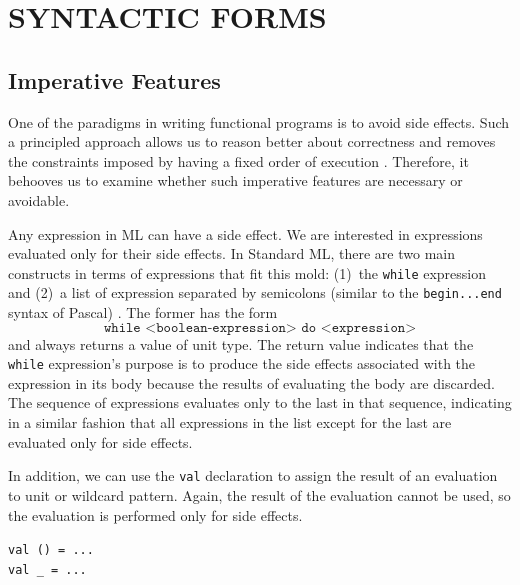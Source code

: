 \documentclass[12pt,abstracton]{scrartcl}
\begin{document}
\section{SYNTACTIC FORMS}\label{sec:syntax}
\subsection{Imperative Features}\label{subsec:imper}
One of the paradigms in writing functional programs is to avoid side effects.
Such a principled approach allows us to reason better about correctness and
removes the constraints imposed by having a fixed order of execution \cite{Hug90}. Therefore,
it behooves us to examine whether such imperative features are necessary or avoidable.

Any expression in ML can have a side effect. 
We are interested in expressions evaluated only for their side effects.
In Standard ML, there are two main constructs in terms of expressions that fit this mold:
(1)~the \texttt{while} expression and (2)~a list of expression separated by semicolons (similar to the \texttt{begin...end} syntax of Pascal) \cite{Ull98}.
The former has the form
\[\texttt{while <boolean-expression> do <expression>}\] and always returns a value of unit type.
The return value indicates that the \texttt{while} expression's purpose is to produce the side effects associated
with the expression in its body because the results of evaluating the body are discarded.
The sequence of expressions evaluates only to the last in that sequence, indicating
in a similar fashion that all expressions in the list except for the last are evaluated only for side effects.

In addition, we can use the \texttt{val} declaration to assign the result
of an evaluation to unit or wildcard pattern. Again, the result of the evaluation
cannot be used, so the evaluation is performed only for side effects.
\begin{center}
\texttt{val () = ...}\\
\texttt{val \_ = ...}
\end{center}
\end{document}
